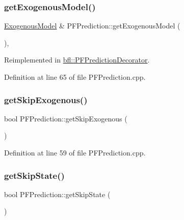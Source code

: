 \subsubsection{\texorpdfstring{get\+Exogenous\+Model()}{getExogenousModel()}}
{\footnotesize\ttfamily \mbox{\hyperlink{classbfl_1_1ExogenousModel}{Exogenous\+Model}} \& P\+F\+Prediction\+::get\+Exogenous\+Model (\begin{DoxyParamCaption}{ }\end{DoxyParamCaption})\hspace{0.3cm}{\ttfamily [virtual]}, {\ttfamily [inherited]}}



Reimplemented in \mbox{\hyperlink{classbfl_1_1PFPredictionDecorator_a8d25d3765f642f7de1af897d088d8da9}{bfl\+::\+P\+F\+Prediction\+Decorator}}.



Definition at line 65 of file P\+F\+Prediction.\+cpp.

\mbox{\label{classbfl_1_1PFPrediction_a432b8e84dbf00432158aa82312386d63}} 
\subsubsection{\texorpdfstring{get\+Skip\+Exogenous()}{getSkipExogenous()}}
{\footnotesize\ttfamily bool P\+F\+Prediction\+::get\+Skip\+Exogenous (\begin{DoxyParamCaption}{ }\end{DoxyParamCaption})\hspace{0.3cm}{\ttfamily [inherited]}}



Definition at line 59 of file P\+F\+Prediction.\+cpp.

\mbox{\label{classbfl_1_1PFPrediction_a323ca5612dd7ad924fd448a629359ad2}} 
\subsubsection{\texorpdfstring{get\+Skip\+State()}{getSkipState()}}
{\footnotesize\ttfamily bool P\+F\+Prediction\+::get\+Skip\+State (\begin{DoxyParamCaption}{ }\end{DoxyParamCaption})\hspace{0.3cm}{\ttfamily [inherited]}}



